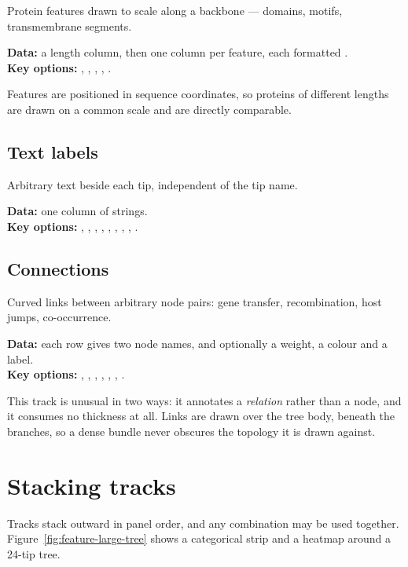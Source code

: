 Protein features drawn to scale along a backbone --- domains, motifs,
transmembrane segments.

\textbf{Data:} a length column, then one column per feature, each formatted
.\\
\textbf{Key options:} , ,
, , .

Features are positioned in sequence coordinates, so proteins of different lengths
are drawn on a common scale and are directly comparable.


\subsection{Text labels}

Arbitrary text beside each tip, independent of the tip name.

\textbf{Data:} one column of strings.\\
\textbf{Key options:} , , , ,
, , , ,
.


\subsection{Connections}

Curved links between arbitrary node pairs: gene transfer, recombination, host
jumps, co-occurrence.

\textbf{Data:} each row gives two node names, and optionally a weight, a colour
and a label.\\
\textbf{Key options:} , , ,
, , , .

This track is unusual in two ways: it annotates a \emph{relation} rather than a
node, and it consumes no thickness at all. Links are drawn over the tree body,
beneath the branches, so a dense bundle never obscures the topology it is drawn
against.


\section{Stacking tracks}

Tracks stack outward in panel order, and any combination may be used together.
Figure~\ref{fig:feature-large-tree} shows a categorical strip and a heatmap
around a 24-tip tree.

